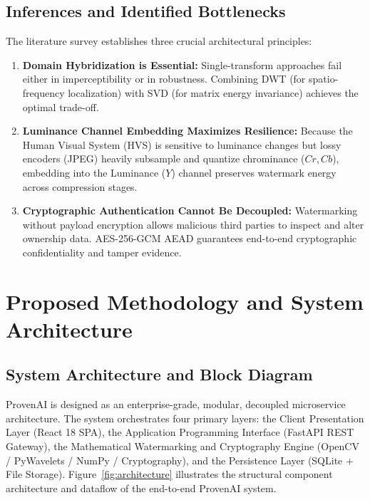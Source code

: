 \documentclass[12pt,a4paper]{report}
\begin{document}
\section{Inferences and Identified Bottlenecks}
The literature survey establishes three crucial architectural principles:
\begin{enumerate}
    \item \textbf{Domain Hybridization is Essential:} Single-transform approaches fail either in imperceptibility or in robustness. Combining DWT (for spatio-frequency localization) with SVD (for matrix energy invariance) achieves the optimal trade-off.
    \item \textbf{Luminance Channel Embedding Maximizes Resilience:} Because the Human Visual System (HVS) is sensitive to luminance changes but lossy encoders (JPEG) heavily subsample and quantize chrominance ($Cr, Cb$), embedding into the Luminance ($Y$) channel preserves watermark energy across compression stages.
    \item \textbf{Cryptographic Authentication Cannot Be Decoupled:} Watermarking without payload encryption allows malicious third parties to inspect and alter ownership data. AES-256-GCM AEAD guarantees end-to-end cryptographic confidentiality and tamper evidence.
\end{enumerate}

\chapter{Proposed Methodology and System Architecture}

\section{System Architecture and Block Diagram}
ProvenAI is designed as an enterprise-grade, modular, decoupled microservice architecture. The system orchestrates four primary layers: the Client Presentation Layer (React 18 SPA), the Application Programming Interface (FastAPI REST Gateway), the Mathematical Watermarking and Cryptography Engine (OpenCV / PyWavelets / NumPy / Cryptography), and the Persistence Layer (SQLite + File Storage). Figure~\ref{fig:architecture} illustrates the structural component architecture and dataflow of the end-to-end ProvenAI system.
\end{document}
